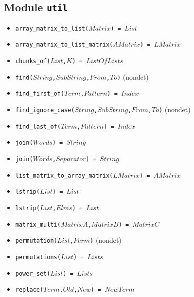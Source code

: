 \documentclass[10pt]{article}
\begin{document}
\begin{multicols}{2}
\section*{Module \texttt{util}}
\begin{scriptsize}
\begin{itemize}
    \item \texttt{array\_matrix\_to\_list($Matrix$) = $List$}
    \item \texttt{array\_matrix\_to\_list\_matrix($AMatrix$) = $LMatrix$}
    \item \texttt{chunks\_of($List$,$K$) = $ListOfLists$}
    \item \texttt{find($String$,$SubString$,$From$,$To$)} (nondet)
    \item \texttt{find\_first\_of($Term$,$Pattern$) = $Index$}
    \item \texttt{find\_ignore\_case($String$,$SubString$,$From$,$To$)} (nondet)
    \item \texttt{find\_last\_of($Term$,$Pattern$) = $Index$}
    \item \texttt{join($Words$) = $String$}
    \item \texttt{join($Words$,$Separator$) = $String$}
    \item \texttt{list\_matrix\_to\_array\_matrix($LMatrix$) = $AMatrix$} 
    \item \texttt{lstrip($List$) = $List$ }
    \item \texttt{lstrip($List$,$Elms$) = $List$ }
    \item \texttt{matrix\_multi($MatrixA$,$MatrixB$) = $MatrixC$}
    \item \texttt{permutation($List$,$Perm$)} (nondet)
    \item \texttt{permutations($List$) = $Lists$}
    \item \texttt{power\_set($List$) = $Lists$}
    \item \texttt{replace($Term$,$Old$,$New$) = $NewTerm$}

\end{itemize}
\end{scriptsize}
\end{multicols}
\end{document}
